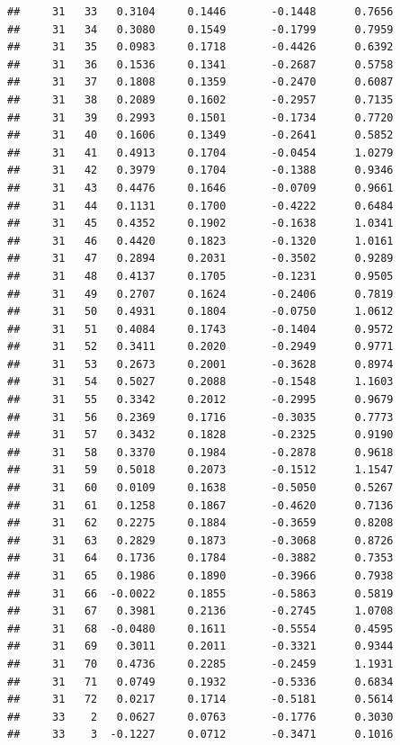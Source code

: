 \documentclass[
]{article}
\begin{document}
\begin{verbatim}
##     31   33   0.3104     0.1446       -0.1448      0.7656  
##     31   34   0.3080     0.1549       -0.1799      0.7959  
##     31   35   0.0983     0.1718       -0.4426      0.6392  
##     31   36   0.1536     0.1341       -0.2687      0.5758  
##     31   37   0.1808     0.1359       -0.2470      0.6087  
##     31   38   0.2089     0.1602       -0.2957      0.7135  
##     31   39   0.2993     0.1501       -0.1734      0.7720  
##     31   40   0.1606     0.1349       -0.2641      0.5852  
##     31   41   0.4913     0.1704       -0.0454      1.0279  
##     31   42   0.3979     0.1704       -0.1388      0.9346  
##     31   43   0.4476     0.1646       -0.0709      0.9661  
##     31   44   0.1131     0.1700       -0.4222      0.6484  
##     31   45   0.4352     0.1902       -0.1638      1.0341  
##     31   46   0.4420     0.1823       -0.1320      1.0161  
##     31   47   0.2894     0.2031       -0.3502      0.9289  
##     31   48   0.4137     0.1705       -0.1231      0.9505  
##     31   49   0.2707     0.1624       -0.2406      0.7819  
##     31   50   0.4931     0.1804       -0.0750      1.0612  
##     31   51   0.4084     0.1743       -0.1404      0.9572  
##     31   52   0.3411     0.2020       -0.2949      0.9771  
##     31   53   0.2673     0.2001       -0.3628      0.8974  
##     31   54   0.5027     0.2088       -0.1548      1.1603  
##     31   55   0.3342     0.2012       -0.2995      0.9679  
##     31   56   0.2369     0.1716       -0.3035      0.7773  
##     31   57   0.3432     0.1828       -0.2325      0.9190  
##     31   58   0.3370     0.1984       -0.2878      0.9618  
##     31   59   0.5018     0.2073       -0.1512      1.1547  
##     31   60   0.0109     0.1638       -0.5050      0.5267  
##     31   61   0.1258     0.1867       -0.4620      0.7136  
##     31   62   0.2275     0.1884       -0.3659      0.8208  
##     31   63   0.2829     0.1873       -0.3068      0.8726  
##     31   64   0.1736     0.1784       -0.3882      0.7353  
##     31   65   0.1986     0.1890       -0.3966      0.7938  
##     31   66  -0.0022     0.1855       -0.5863      0.5819  
##     31   67   0.3981     0.2136       -0.2745      1.0708  
##     31   68  -0.0480     0.1611       -0.5554      0.4595  
##     31   69   0.3011     0.2011       -0.3321      0.9344  
##     31   70   0.4736     0.2285       -0.2459      1.1931  
##     31   71   0.0749     0.1932       -0.5336      0.6834  
##     31   72   0.0217     0.1714       -0.5181      0.5614  
##     33    2   0.0627     0.0763       -0.1776      0.3030  
##     33    3  -0.1227     0.0712       -0.3471      0.1016  

\end{verbatim}
\end{document}
